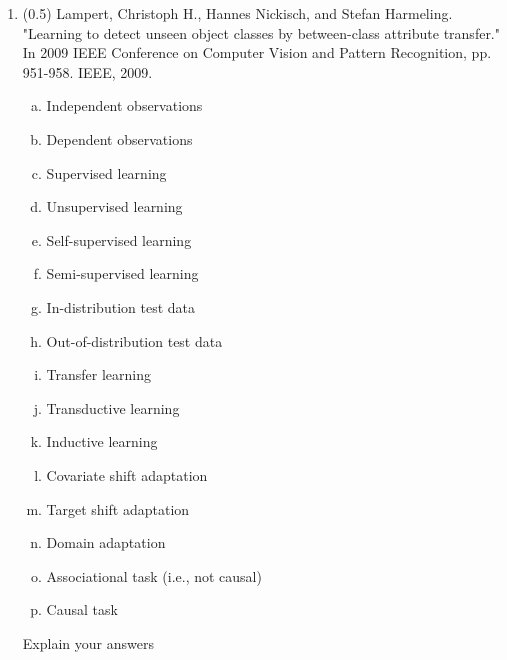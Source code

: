 \documentclass{article}
\begin{document}
\newpage
\begin{enumerate}
\item (0.5) Lampert, Christoph H., Hannes Nickisch, and Stefan Harmeling. "Learning to detect unseen object classes by between-class attribute transfer." In 2009 IEEE Conference on Computer Vision and Pattern Recognition, pp. 951-958. IEEE, 2009.
\begin{enumerate}[(a)]
\item Independent observations
\item Dependent observations
\item Supervised learning
\item Unsupervised learning
\item Self-supervised learning
\item Semi-supervised learning
\item In-distribution test data
\item Out-of-distribution test data
\item Transfer learning
\item Transductive learning
\item Inductive  learning
\item Covariate shift adaptation
\item Target shift adaptation
\item Domain adaptation
\item Associational task (i.e., not causal)
\item Causal task
\end{enumerate}
Explain your answers\\
 \underline{\hspace{6in}}\\
 \underline{\hspace{6in}}\\
 \underline{\hspace{6in}}\\
 \underline{\hspace{6in}}\\
 \underline{\hspace{6in}}\\
 \underline{\hspace{6in}}\\
 \underline{\hspace{6in}}\\
 \underline{\hspace{6in}}\\
 \underline{\hspace{6in}}\\
 \underline{\hspace{6in}}\\
 \underline{\hspace{6in}}\\
 \underline{\hspace{6in}}\\
 \underline{\hspace{6in}}\\
 \underline{\hspace{6in}}\\
 \underline{\hspace{6in}}\\
 

\end{enumerate}
\end{document}
